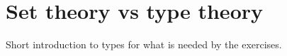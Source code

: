 \section{Set theory vs type theory}
\begin{publictodo}
    Short introduction to types for what is needed by the exercises. 
\end{publictodo}

